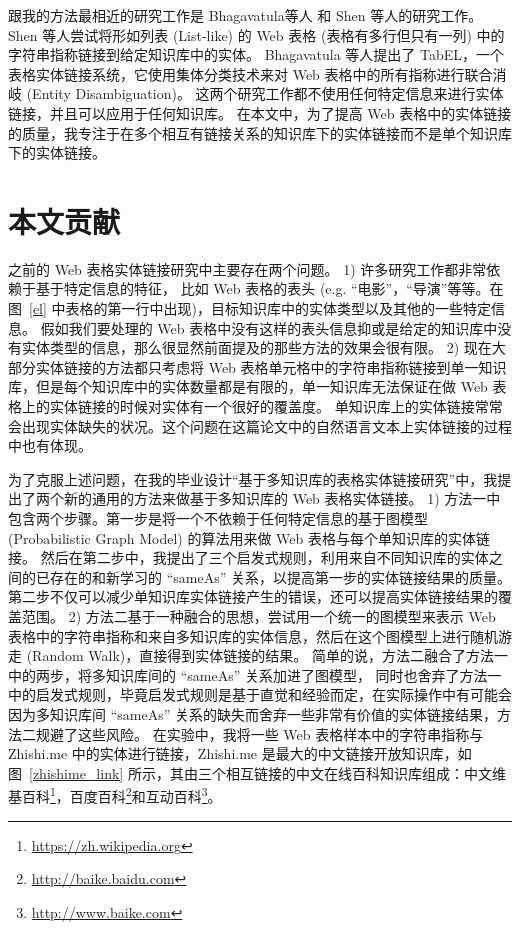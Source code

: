 跟我的方法最相近的研究工作是 Bhagavatula等人\cite{bhagavatula2015tabel} 和 Shen 等人\cite{shen2012liege}的研究工作。
Shen 等人\cite{shen2012liege}尝试将形如列表 (List-like) 的 Web 表格 (表格有多行但只有一列) 中的字符串指称链接到给定知识库中的实体。
Bhagavatula 等人\cite{bhagavatula2015tabel}提出了 TabEL，一个表格实体链接系统，它使用集体分类技术来对 Web 表格中的所有指称进行联合消岐 (Entity Disambiguation)。
这两个研究工作都不使用任何特定信息来进行实体链接，并且可以应用于任何知识库。
在本文中，为了提高 Web 表格中的实体链接的质量，我专注于在多个相互有链接关系的知识库下的实体链接而不是单个知识库下的实体链接。\par


\section{本文贡献}\label{contribution}

之前的 Web 表格实体链接研究中主要存在两个问题。
1) 许多研究工作\cite{limaye2010annotating}\cite{hignette2009fuzzy}\cite{mulwad2013semantic}\cite{syed2010exploiting}\cite{zhang2014towards}\cite{zhang2014learning}都非常依赖于基于特定信息的特征，
比如 Web 表格的表头 (e.g. ``电影''，``导演''等等。在图~\ref{el} 中表格的第一行中出现)，目标知识库中的实体类型以及其他的一些特定信息。
假如我们要处理的 Web 表格中没有这样的表头信息抑或是给定的知识库中没有实体类型的信息，那么很显然前面提及的那些方法的效果会很有限。
2) 现在大部分实体链接的方法\cite{limaye2010annotating}\cite{hignette2009fuzzy}\cite{syed2010exploiting}\cite{zhang2014towards}\cite{zhang2014learning}\cite{shen2012liege}\cite{bhagavatula2015tabel}都只考虑将 Web 表格单元格中的字符串指称链接到单一知识库，但是每个知识库中的实体数量都是有限的，单一知识库无法保证在做 Web 表格上的实体链接的时候对实体有一个很好的覆盖度。
单知识库上的实体链接常常会出现实体缺失的状况。这个问题在这篇论文\cite{pereira2014entity}中的自然语言文本上实体链接的过程中也有体现。\par

为了克服上述问题，在我的毕业设计``基于多知识库的表格实体链接研究''中，我提出了两个新的通用的方法来做基于多知识库的 Web 表格实体链接。
1) 方法一中包含两个步骤。第一步是将一个不依赖于任何特定信息的基于图模型 (Probabilistic Graph Model) 的算法用来做 Web 表格与每个单知识库的实体链接。
然后在第二步中，我提出了三个启发式规则，利用来自不同知识库的实体之间的已存在的和新学习的 ``sameAs'' 关系，以提高第一步的实体链接结果的质量。
第二步不仅可以减少单知识库实体链接产生的错误，还可以提高实体链接结果的覆盖范围。
2) 方法二基于一种融合的思想，尝试用一个统一的图模型来表示 Web 表格中的字符串指称和来自多知识库的实体信息，然后在这个图模型上进行随机游走 (Random Walk)，直接得到实体链接的结果。
简单的说，方法二融合了方法一中的两步，将多知识库间的 ``sameAs'' 关系加进了图模型，
同时也舍弃了方法一中的启发式规则，毕竟启发式规则是基于直觉和经验而定，在实际操作中有可能会因为多知识库间 ``sameAs'' 关系的缺失而舍弃一些非常有价值的实体链接结果，方法二规避了这些风险。
在实验中，我将一些 Web 表格样本中的字符串指称与 Zhishi.me\cite{niu2011zhishi} 中的实体进行链接，Zhishi.me 是最大的中文链接开放知识库，如图~\ref{zhishime_link} 所示，其由三个相互链接的中文在线百科知识库组成：中文维基百科\footnote{\url{https://zh.wikipedia.org}}，百度百科\footnote{\url{http://baike.baidu.com}}和互动百科\footnote{\url{http://www.baike.com}}。

